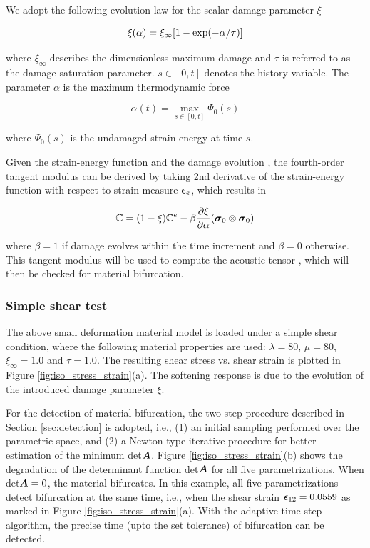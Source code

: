\documentclass[12pt]{article}
\numberwithin{equation}{section}
\begin{document}
We adopt the following evolution law for the scalar damage parameter $
\xi$ \cite{Holzapfel:2000}

\begin{equation}\label{eq:iso_xi}
  \xi(\alpha) = \xi_{\infty} [ 1- {\rm exp}(-\alpha / \tau)]
\end{equation}

where $\xi_{\infty}$ describes the dimensionless maximum damage and
$\tau$ is referred to as the damage saturation parameter. $s \in
[0,t]$ denotes the history variable. The parameter $\alpha$ is the
maximum thermodynamic force \cite{Holzapfel:2000}

\begin{equation}
  \alpha(t) = \max_{s\in [0,t]}\Psi_0(s)
\end{equation}

where $\Psi_0(s)$ is the undamaged strain energy at time $s$.

Given the strain-energy function  and the damage
evolution , the fourth-order tangent modulus can be
derived by taking 2nd derivative of the strain-energy function with
respect to strain measure ${\boldsymbol{\epsilon}}_e$, which results in

\begin{equation}
  \mathbb{C} = (1-\xi)\mathbb{C}^e 
    - \beta \frac{\partial\xi}{\partial\alpha}
    ({\boldsymbol{\sigma}}_0\otimes{\boldsymbol{\sigma}}_0)
\end{equation}

where $\beta = 1$ if damage evolves within the time increment and 
$\beta=0$ otherwise. This tangent modulus will be used to compute the 
acoustic tensor , which will then be checked 
for material bifurcation.

\subsubsection{Simple shear test}

The above small deformation material model is loaded under a simple 
shear condition, where the following material properties are used:
$\lambda = 80$, $\mu = 80$, $\xi_{\infty} = 1.0$ and $\tau = 1.0$. The 
resulting shear stress vs. shear strain is plotted in Figure 
\ref{fig:iso_stress_strain}(a). The softening response is due to the 
evolution of the introduced damage parameter $\xi$. 

For the detection of material bifurcation, the two-step procedure 
described in Section \ref{sec:detection} is adopted, i.e., (1) an 
initial sampling performed over the parametric space, and (2) a 
Newton-type iterative procedure for better estimation of the minimum 
det${\boldsymbol{A}}$. Figure \ref{fig:iso_stress_strain}(b) shows the degradation 
of the determinant function det${\boldsymbol{A}}$ for all five 
parametrizations. When det${\boldsymbol{A}} = 0$, the material bifurcates. In 
this example, all five parametrizations detect bifurcation at the same 
time, i.e., when the shear strain ${\boldsymbol{\epsilon}}_{12}=0.0559$ as marked in 
Figure \ref{fig:iso_stress_strain}(a). With the adaptive time step 
algorithm, the precise time (upto the set tolerance) of bifurcation 
can be detected.
\end{document}
